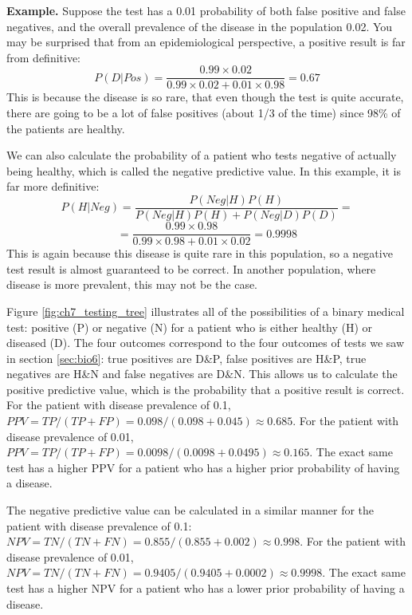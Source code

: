 \documentclass[
]{book}
\theoremstyle{definition}
\theoremstyle{definition}
\theoremstyle{definition}
\theoremstyle{remark}
\begin{document}
\textbf{Example.} Suppose the test has a 0.01 probability of both false positive and false negatives, and the overall prevalence of the disease in the population 0.02. You may be surprised that from an epidemiological perspective, a positive result is far from definitive:
\[ P(D | Pos)  = \frac{0.99 \times 0.02}{0.99 \times 0.02 + 0.01 \times 0.98} = 0.67 \]
This is because the disease is so rare, that even though the test is quite accurate, there are going to be a lot of false positives (about 1/3 of the time) since 98\% of the patients are healthy.

We can also calculate the probability of a patient who tests negative of actually being healthy, which is called the negative predictive value. In this example, it is far more definitive:
\[ P(H | Neg)  = \frac{P(Neg|H)P(H)}{P(Neg|H) P(H) + P(Neg | D)P(D)} = \]
\[ = \frac{0.99 \times 0.98}{0.99 \times 0.98 + 0.01 \times 0.02} =  0.9998\]
This is again because this disease is quite rare in this population, so a negative test result is almost guaranteed to be correct. In another population, where disease is more prevalent, this may not be the case.

Figure \ref{fig:ch7_testing_tree} illustrates all of the possibilities of a binary medical test: positive (P) or negative (N) for a patient who is either healthy (H) or diseased (D). The four outcomes correspond to the four outcomes of tests we saw in section \ref{sec:bio6}: true positives are D\&P, false positives are H\&P, true negatives are H\&N and false negatives are D\&N. This allows us to calculate the positive predictive value, which is the probability that a positive result is correct. For the patient with disease prevalence of 0.1, \(PPV = TP/(TP+FP) = 0.098/(0.098+0.045) \approx 0.685\). For the patient with disease prevalence of 0.01, \(PPV = TP/(TP+FP) = 0.0098/(0.0098+0.0495) \approx 0.165\). The exact same test has a higher PPV for a patient who has a higher prior probability of having a disease.

The negative predictive value can be calculated in a similar manner for the patient with disease prevalence of 0.1: \(NPV = TN/(TN+FN) = 0.855/(0.855+0.002) \approx 0.998\). For the patient with disease prevalence of 0.01, \(NPV = TN/(TN+FN) = 0.9405/(0.9405+0.0002) \approx 0.9998\). The exact same test has a higher NPV for a patient who has a lower prior probability of having a disease.
\end{document}
